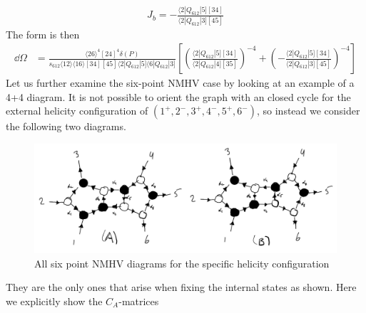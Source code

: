 \documentclass[letter,11pt]{article}
\newcommand{\ab}[1]{\langle #1 \rangle}
\newcommand{\sqb}[1]{[ #1 ]}
\newcommand{\aMs}[3]{\langle #1|#2|#3]}  		%
\begin{document}
\begin{equation}
	\begin{aligned}
		J_b=-\frac{\aMs{2}{Q_{612}}{5}\sqb{34}}{\aMs{2}{Q_{612}}{3}\sqb{45}}
	\end{aligned}
\end{equation}
The form is then
\begin{equation}
	\begin{aligned}
		\dd\Omega&=\frac{\ab{26}^4\sqb{24}^4\delta(P)}{s_{612}\ab{12}\ab{16}\sqb{34}\sqb{45}\aMs{2}{Q_{612}}{5}\aMs{6}{Q_{612}}{3}}\left[\left(\frac{\aMs{2}{Q_{612}}{5}\sqb{34}}{\aMs{2}{Q_{612}}{4}\sqb{35}}\right)^{-4}+\left(-\frac{\aMs{2}{Q_{612}}{5}\sqb{34}}{\aMs{2}{Q_{612}}{3}\sqb{45}}\right)^{-4}\right]
	\end{aligned}
\end{equation}
Let us further examine the six-point NMHV case by looking at an example of a 4+4 diagram. It is not possible to orient the graph with an closed cycle for the external helicity configuration of $(1^+,2^-,3^+,4^-,5^+,6^-)$, so instead we consider the following two diagrams.
\begin{figure}[H]
	\centering
	\includegraphics[width=0.9\linewidth]{6pt}
	\caption{All six point NMHV diagrams for the specific helicity configuration}
	\label{fig:two-loop}
\end{figure}
They are the only ones that arise when fixing the internal states as shown. Here we explicitly show the $C_A$-matrices
\end{document}
